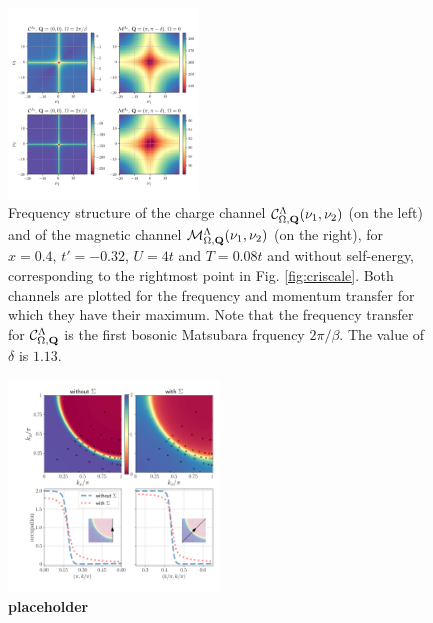 \begin{figure}
\includegraphics[width=0.45\textwidth]{images/Phi_color_all.png}
\caption{Frequency structure of the charge channel $\mathcal{C}^\Lambda_{\Omega,\mathbf{Q}}(\nu_1,\nu_2)$ (on the left) and of the magnetic channel $\mathcal{M}^\Lambda_{\Omega,\mathbf{Q}}(\nu_1,\nu_2)$ (on the right), for $x=0.4$, $t'=-0.32$, $U=4t$ and $T=0.08t$ and without self-energy, corresponding to the rightmost point in Fig. \ref{fig:criscale}. 
Both channels are plotted for the frequency and momentum transfer for which they have their maximum. Note that the frequency transfer for $\mathcal{C}^\Lambda_{\Omega,\mathbf{Q}}$ is the first bosonic Matsubara frquency $2\pi/\beta$. 
The value of $\delta$ is $1.13$.  
 }  
\label{fig:freqplot} 
\end{figure}


\begin{figure}
\includegraphics[width=0.5\textwidth]{images/occupations_0975.png}
\caption{\textbf{placeholder}} 
\label{fig:occupation}
\end{figure}

